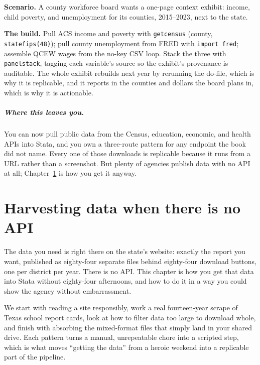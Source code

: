 \documentclass[
    a4paper,
    fontsize=10pt,
    twoside=true,
    numbers=noenddot,
]{kaobook}
\newcounter{appliedexample}
\newenvironment{appliedexample}[1][]{%
    \refstepcounter{appliedexample}%
    \begin{appliedexamplebox}[frametitle={Applied Example~\theappliedexample.~~#1}]%
}{%
    \end{appliedexamplebox}%
}
\begin{document}
\begin{appliedexample}[A Texas county panel from three APIs]
\textbf{Scenario.} A county workforce board wants a one-page context exhibit: income, child poverty, and unemployment for its counties, 2015--2023, next to the state.

\medskip
\textbf{The build.} Pull ACS income and poverty with \texttt{getcensus} (county, \texttt{statefips(48)}); pull county unemployment from FRED with \texttt{import fred}; assemble QCEW wages from the no-key CSV loop. Stack the three with \texttt{panelstack}, tagging each variable's source so the exhibit's provenance is auditable. The whole exhibit rebuilds next year by rerunning the do-file, which is why it is replicable, and it reports in the counties and dollars the board plans in, which is why it is actionable.
\end{appliedexample}

\paragraph{Where this leaves you.} You can now pull public data from the Census, education, economic, and health APIs into Stata, and you own a three-route pattern for any endpoint the book did not name. Every one of those downloads is replicable because it runs from a URL rather than a screenshot. But plenty of agencies publish data with no API at all; Chapter~\ref{ch:noapi} is how you get it anyway.

\chapter{Harvesting data when there is no API}\label{ch:noapi}

The data you need is right there on the state's website: exactly the report you want, published as eighty-four separate files behind eighty-four download buttons, one per district per year. There is no API. This chapter is how you get that data into Stata without eighty-four afternoons, and how to do it in a way you could show the agency without embarrassment.

We start with reading a site responsibly, work a real fourteen-year scrape of Texas school report cards, look at how to filter data too large to download whole, and finish with absorbing the mixed-format files that simply land in your shared drive. Each pattern turns a manual, unrepeatable chore into a scripted step, which is what moves \enquote{getting the data} from a heroic weekend into a replicable part of the pipeline.
\end{document}
